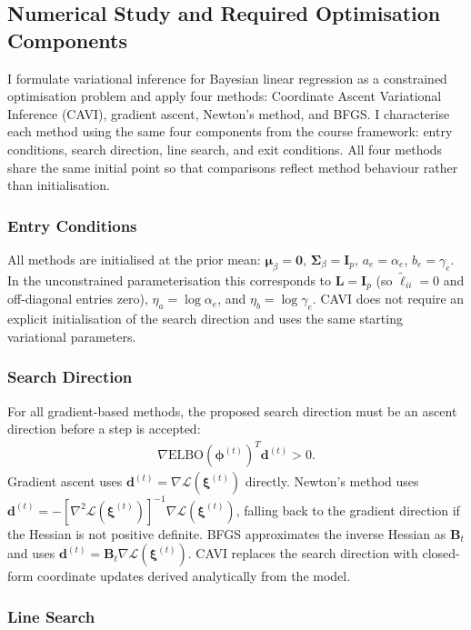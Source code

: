 \documentclass[11pt,a4paper]{article}
\newcommand{\ELBO}{\text{ELBO}}
\begin{document}
 
\subsection{Numerical Study and Required Optimisation Components}

I formulate variational inference for Bayesian linear regression as a constrained optimisation problem and apply four methods: Coordinate Ascent Variational Inference (CAVI), gradient ascent, Newton's method, and BFGS. I characterise each method using the same four components from the course framework: entry conditions, search direction, line search, and exit conditions. All four methods share the same initial point so that comparisons reflect method behaviour rather than initialisation.

\subsubsection*{Entry Conditions}

All methods are initialised at the prior mean: $\bm{\mu}_\beta = \bm{0}$, $\bm{\Sigma}_\beta = \bm{I}_p$, $a_e = \alpha_e$, $b_e = \gamma_e$. In the unconstrained parameterisation this corresponds to $\bm{L} = \bm{I}_p$ (so $\tilde{\ell}_{ii} = 0$ and off-diagonal entries zero), $\eta_a = \log \alpha_e$, and $\eta_b = \log \gamma_e$. CAVI does not require an explicit initialisation of the search direction and uses the same starting variational parameters.

\subsubsection*{Search Direction}

For all gradient-based methods, the proposed search direction must be an ascent direction before a step is accepted:
\begin{align}
\nabla \ELBO(\bm{\phi}^{(t)})^T \bm{d}^{(t)} > 0.
\end{align}
Gradient ascent uses $\bm{d}^{(t)} = \nabla\mathcal{L}(\bm{\xi}^{(t)})$ directly. Newton's method uses $\bm{d}^{(t)} = -[\nabla^2\mathcal{L}(\bm{\xi}^{(t)})]^{-1}\nabla\mathcal{L}(\bm{\xi}^{(t)})$, falling back to the gradient direction if the Hessian is not positive definite. BFGS approximates the inverse Hessian as $\bm{B}_t$ and uses $\bm{d}^{(t)} = \bm{B}_t \nabla\mathcal{L}(\bm{\xi}^{(t)})$. CAVI replaces the search direction with closed-form coordinate updates derived analytically from the model.

\subsubsection*{Line Search}
\end{document}
